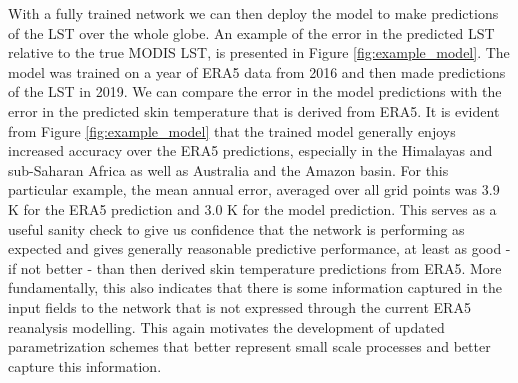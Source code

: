 \documentclass[twocolumn]{article}
\begin{document}
\noindent With a fully trained network we can then deploy the model to make predictions of the LST over the whole globe. An example of the error in the predicted LST relative to the true MODIS LST, is presented  in Figure \ref{fig:example_model}. The model was trained on a year of ERA5 data from 2016 and then made predictions of the LST in 2019. We can compare the error in the model predictions with the error in the predicted skin temperature that is derived from ERA5. It is evident from Figure \ref{fig:example_model} that the trained model generally enjoys increased accuracy over the ERA5 predictions, especially in the Himalayas and sub-Saharan Africa as well as Australia and the Amazon basin. For this particular example, the mean annual error, averaged over all grid points was 3.9 K for the ERA5 prediction and 3.0 K for the model prediction. This serves as a useful sanity check to give us confidence that the network is performing as expected and gives generally reasonable predictive performance, at least as good - if not better - than then derived skin temperature predictions from ERA5. More fundamentally, this also indicates that there is some information captured in the input fields to the network that is not expressed through the current ERA5 reanalysis modelling. This again motivates the development of updated parametrization schemes that better represent small scale processes and better capture this information.  \newline
\end{document}

